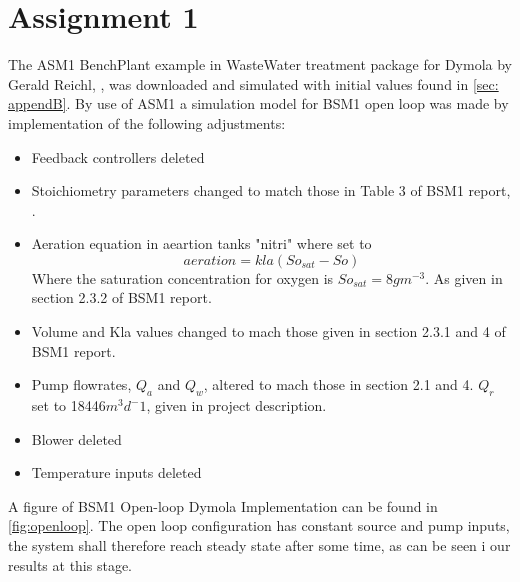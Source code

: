\section*{Assignment 1}\label{sec:Ass1}
The ASM1 BenchPlant example in WasteWater treatment package for Dymola by Gerald Reichl, \cite{wastwater}, was downloaded and simulated with initial values found in \cref{sec: appendB}. By use of ASM1 a simulation model for BSM1 open loop was made by implementation of the following adjustments:\newline
\begin{itemize}
    \item Feedback controllers deleted
    \item Stoichiometry parameters changed to match those in Table 3 of BSM1 report, \cite{alex2008}.
    \item Aeration equation in aeartion tanks "nitri" where set to 
    \begin{equation}
        aeration=kla(So_{sat}-So)
    \end{equation}
    Where the saturation concentration for oxygen is $So_{sat}=8gm^{-3}$. As given in section 2.3.2 of BSM1 report.
    \item Volume and Kla values changed to mach those given in section 2.3.1 and 4 of BSM1 report.
    \item Pump flowrates, $Q_{a}$ and $Q_{w}$, altered to mach those in section 2.1 and 4. $Q_{r}$ set to 18446$m^3d^-1$, given in project description.   
    \item Blower deleted
    \item Temperature inputs deleted
\end{itemize}
A figure of BSM1 Open-loop Dymola Implementation can be found in \cref{fig:openloop}. The open loop configuration has constant source and pump inputs, the system shall therefore reach steady state after some time, as can be seen i our results at this stage. 